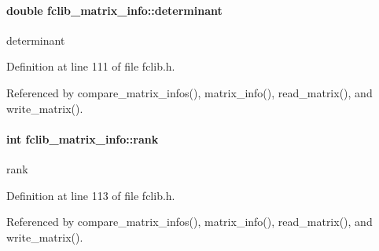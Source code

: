 \paragraph[{determinant}]{\setlength{\rightskip}{0pt plus 5cm}double fclib\+\_\+matrix\+\_\+info\+::determinant}\label{structfclib__matrix__info_a9c6697aee458be4494b215f0f003ca48}


determinant 



Definition at line 111 of file fclib.\+h.



Referenced by compare\+\_\+matrix\+\_\+infos(), matrix\+\_\+info(), read\+\_\+matrix(), and write\+\_\+matrix().

\hypertarget{structfclib__matrix__info_af838043a1769956958c4a66e6227227d}{}
\paragraph[{rank}]{\setlength{\rightskip}{0pt plus 5cm}int fclib\+\_\+matrix\+\_\+info\+::rank}\label{structfclib__matrix__info_af838043a1769956958c4a66e6227227d}


rank 



Definition at line 113 of file fclib.\+h.



Referenced by compare\+\_\+matrix\+\_\+infos(), matrix\+\_\+info(), read\+\_\+matrix(), and write\+\_\+matrix().

